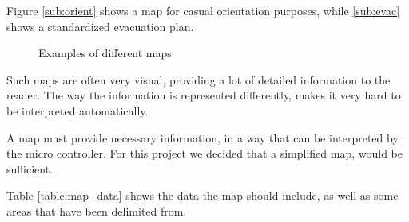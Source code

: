 Figure \ref{sub:orient} shows a map for casual orientation purposes,
while \ref{sub:evac} shows a standardized evacuation plan.

\begin{figure}[h!tp]
    \centering
    \hspace{0.1\textwidth}
    \caption{Examples of different maps}
    \label{fig:floor_plans}
\end{figure}

Such maps are often very visual, providing a lot of detailed information to the reader.
The way the information is represented differently,
makes it very hard to be interpreted automatically.

A map must provide necessary information,
in a way that can be interpreted by the micro controller.
For this project we decided that a simplified map, would be sufficient.

Table \ref{table:map_data} shows the data the map should include,
as well as some areas that have been delimited from.

